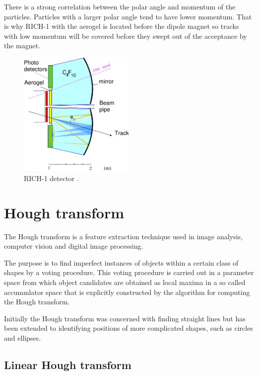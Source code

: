 \documentclass[11pt,twoside]{scrreprt}
\begin{document}
There is a strong correlation between the polar angle and momentum of the particles. Particles with a larger polar angle tend to have 
lower momentum. That is why RICH-1 with the aerogel is located before the dipole magnet so tracks with low momentum will be covered 
before they swept out of the acceptance by the magnet.

\begin{figure}[tb]
  \centering
  \includegraphics[width=0.5\textwidth]{pics/rich1_schematic}
  \caption{RICH-1 detector \cite{LHCb:2000}.}
  \label{fig:rich1}
\end{figure}



\section{Hough transform} %
\label{sec:hough_transform}

The Hough transform \cite{Duda:1972} is a feature extraction technique used in image analysis, computer vision and digital image processing.

The purpose is to find imperfect instances of objects within a certain class of shapes by a voting procedure. This voting procedure is 
carried out in a parameter space from which object candidates are obtained as local maxima in a so called accummlator space that is 
explicitly constructed by the algorithm for computing the Hough transform.

Initially the Hough transform was concerned with finding straight lines \cite{c1962method} but has been extended to identifying positions 
of more complicated shapes, such as circles and ellipses.

\subsection{Linear Hough transform} %
\label{sub:linear_hough_transform}
\end{document}
